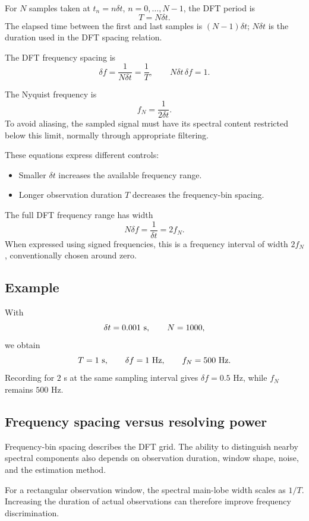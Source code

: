 \documentclass[11pt,letterpaper]{article}
\begin{document}
For $N$ samples taken at $t_n=n\delta t$, $n=0,\ldots,N-1$,
the DFT period is
\[
T=N\delta t.
\]
The elapsed time between the first and last samples is
$(N-1)\delta t$; $N\delta t$ is the duration used in the DFT
spacing relation.

The DFT frequency spacing is
\begin{equation}
\boxed{
\delta f=\frac{1}{N\delta t}=\frac{1}{T},
\qquad N\delta t\,\delta f=1.
}
\end{equation}

The Nyquist frequency is
\begin{equation}
\boxed{f_N=\frac{1}{2\delta t}.}
\end{equation}
To avoid aliasing, the sampled signal must have its spectral content
restricted below this limit, normally through appropriate filtering.

These equations express different controls:
\begin{itemize}
\item Smaller $\delta t$ increases the available frequency range.
\item Longer observation duration $T$ decreases the frequency-bin
spacing.
\end{itemize}

The full DFT frequency range has width
\[
N\delta f=\frac{1}{\delta t}=2f_N.
\]
When expressed using signed frequencies, this is a frequency interval
of width $2f_N$, conventionally chosen around zero.

\subsection*{Example}

With
\[
\delta t=0.001\ {\rm s},\qquad N=1000,
\]
we obtain
\[
T=1\ {\rm s},\qquad
\delta f=1\ {\rm Hz},\qquad f_N=500\ {\rm Hz}.
\]
Recording for $2$ s at the same sampling interval gives
$\delta f=0.5$ Hz, while $f_N$ remains $500$ Hz.

\subsection*{Frequency spacing versus resolving power}

Frequency-bin spacing describes the DFT grid. The ability to
distinguish nearby spectral components also depends on observation
duration, window shape, noise, and the estimation method.

For a rectangular observation window, the spectral main-lobe width
scales as $1/T$. Increasing the duration of actual observations can
therefore improve frequency discrimination.
\end{document}

